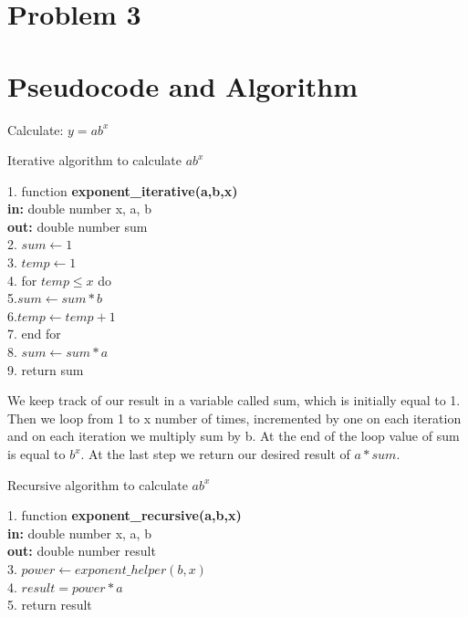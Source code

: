 \documentclass[a4paper, 11pt]{article}
\begin{document}
\newpage
\section*{Problem 3}
\section*{Pseudocode and Algorithm}
Calculate: $y = ab^x$

\begin{algorithm}
\caption{Iterative algorithm to calculate $ab^x$}
\begin{algorithmic} 
1. function \textbf{exponent\_iterative(a,b,x)}\\
\textbf{in: } double number x, a, b\\
\textbf{out: } double number sum\\
2. \STATE $sum \leftarrow 1$\\
3. \STATE $temp \leftarrow 1$\\
4. for {$temp \leq x$} do\\
5.\qquad \STATE $sum \leftarrow sum*b$\\
6.\qquad\STATE $temp \leftarrow temp+1$\\
7. end for \\
8. \STATE $sum \leftarrow sum*a$\\
9. \STATE return sum\\
\end{algorithmic}
\end{algorithm}
We keep track of our result in a variable called sum, which is initially equal to 1. Then we loop from 1 to x number of times, incremented by one on each iteration and on each iteration we multiply sum by b. At the end of the loop value of sum is equal to $b^x$. At the last step we return our desired result of $a * sum$.
\newpage
\begin{algorithm}
\caption{Recursive algorithm to calculate $ab^x$}
\begin{algorithmic} 
1. function \textbf{exponent\_recursive(a,b,x)}\\
\textbf{in: } double number x, a, b\\
\textbf{out: } double number result\\
3. \STATE $power \leftarrow exponent\_helper(b,x)$\\
4. \STATE $result = power * a$\\
5. return result
\end{algorithmic}
\end{algorithm}
\end{document}
